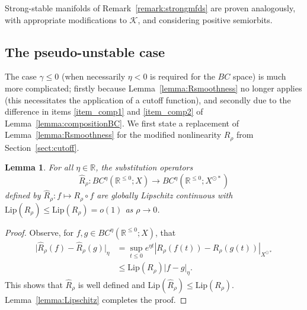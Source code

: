 \documentclass[a4paper, 12pt, oneside, reqno, notitlepage]{amsart}
\theoremstyle{plain}
\newtheorem{lemma}[theorem]{Lemma}
\theoremstyle{definition}
\theoremstyle{remark}
\newcommand{\lip}{\mathrm{Lip}}
\begin{document}
Strong-stable manifolds of Remark~\ref{remark:strongmfds} are proven analogously, with appropriate modifications to $\mathcal{K}$, and considering positive semiorbits.


\subsection{The pseudo-unstable case}

The case $\gamma \leq 0$ (when necessarily $\eta <0$ is required for the $BC$ space) is much more complicated; firstly because Lemma~\ref{lemma:Rsmoothness} no longer applies (this necessitates the application of a cutoff function), and secondly due to the difference in items \ref{item_comp1} and \ref{item_comp2} of Lemma~\ref{lemma:compositionBC}.
We first state a replacement of Lemma~\ref{lemma:Rsmoothness} for the modified nonlinearity $R_\rho$ from Section~\ref{sect:cutoff}.

\begin{lemma}
    For all $\eta \in \mathbb{R}$, the substitution operators 
    \begin{displaymath}
        \widehat{R}_\rho: BC^{\eta} (\mathbb{R}^{\leq 0};X)\to BC^{\eta} (\mathbb{R}^{\leq 0};X^{\odot *})
    \end{displaymath}
    defined by $\widehat{R}_\rho : f \mapsto R_\rho \circ f$
    are globally Lipschitz continuous with $\lip(\widehat{R}_\rho) \leq \lip(R_\rho) = o(1)$ as $\rho \to 0$.
\end{lemma}

\begin{proof}
    Observe, for $f,g \in  BC^{\eta} (\mathbb{R}^{\leq 0};X)$, that
    \begin{align*}
        \big| \widehat{R}_\rho(f) - \widehat{R}_\rho(g) \big|_{\eta} &= \sup_{t \leq 0} e^{\eta t} \left| R_\rho (f(t)) - R_\rho (g(t))\right|_{X^{\odot *}} \\
        &\leq \lip(R_\rho) \left| f-g \right|_{\eta}.
    \end{align*}
    This shows that $\widehat{R}_\rho$ is well defined and $\lip(\widehat{R}_\rho) \leq \lip(R_\rho)$. Lemma~\ref{lemma:Lipschitz} completes the proof.
\end{proof}
\end{document}
